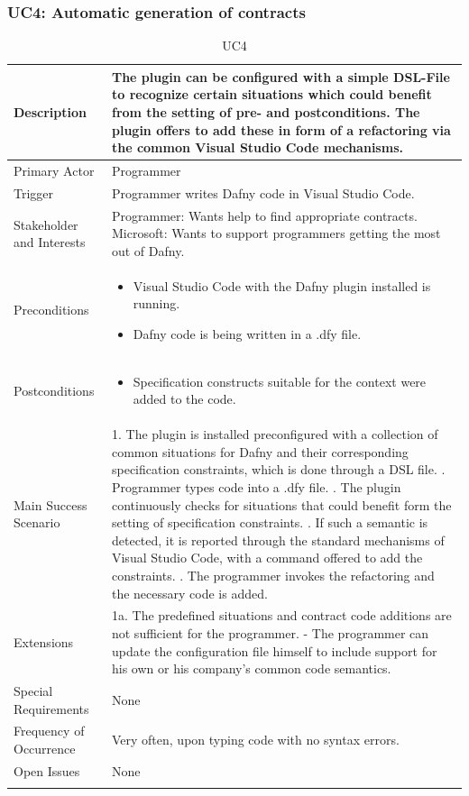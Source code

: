 \subsubsection{UC4: Automatic generation of contracts}
\begin{longtable}{l | p{} }
	Description & The plugin can be configured with a simple DSL-File to recognize certain situations which could benefit from the setting of pre- and postconditions. The plugin offers to add these in form of a refactoring via the common Visual Studio Code mechanisms.\\ \hline
	Primary Actor & Programmer\\ \hline
	Trigger & Programmer writes Dafny code in Visual Studio Code.\\ \hline
	Stakeholder and Interests & Programmer: Wants help to find appropriate contracts. \newline Microsoft: Wants to support programmers getting the most out of Dafny.\\ \hline
	Preconditions &
	\begin{itemize}
		\item Visual Studio Code with the Dafny plugin installed is running.
		\item Dafny code is being written in a .dfy file.
	\end{itemize}\\ \hline
	Postconditions &
	\begin{itemize}
		\item Specification constructs suitable for the context were added to the code.
	\end{itemize}\\ \hline
	Main Success Scenario & 
	1. The plugin is installed preconfigured with a collection of common situations for Dafny and their corresponding specification constraints, which is done through a DSL file. \newline
	2. Programmer types code into a .dfy file. \newline 
	3. The plugin continuously checks for situations that could benefit form the setting of specification constraints. \newline 
	4. If such a semantic is detected, it is reported through the standard mechanisms of Visual Studio Code, with a command offered to add the constraints. \newline
	5. The programmer invokes the refactoring and the necessary code is added.\\ \hline
	Extensions & 
	1a. The predefined situations and contract code additions are not sufficient for the programmer. \newline 
	- The programmer can update the configuration file himself to include support for his own or his company's  common code semantics. \\ \hline
	Special Requirements & None\\ \hline
	Frequency of Occurrence & Very often, upon typing code with no syntax errors.\\ \hline
	Open Issues & None \\ \hline
	\caption{UC4}
\end{longtable}

